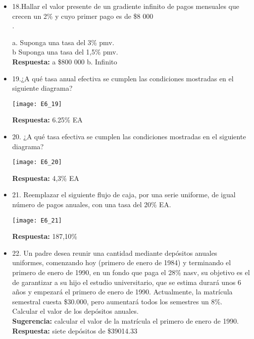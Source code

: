 \begin{itemize}
	\item 18.Hallar el valor presente de un gradiente infinito de pagos mensuales que crecen un 2\% y cuyo primer pago es de \$8 000\\.
	
	a. Suponga una tasa del 3\% pmv.\\
	b Suponga una tasa del 1,5\% pmv.\\
	\textbf{Respuesta:} a \$800 000 \hspace{0,5 cm}  b. Infinito\\
	
	\item 19.¿A qué tasa anual efectiva se cumplen las condiciones mostradas en el siguiente diagrama?\\
	\begin{center}
		\texttt{[image: E6\_19]}
	\end{center}
	\textbf{Respuesta:} 6.25\% EA\\
	\medskip
	
	\item 20. ¿A qué tasa efectiva se cumplen las condiciones mostradas en el siguiente diagrama?\\
	\begin{center}
		\texttt{[image: E6\_20]}
	\end{center}
	\textbf{Respuesta:} 4,3\% EA\\
	\medskip
	
	\item 21. Reemplazar el siguiente flujo de caja, por una serie uniforme, de igual número de pagos anuales, con una tasa del 20\% EA.\\
	\begin{center}
		\texttt{[image: E6\_21]}
	\end{center}
	\textbf{Respuesta:} 187,10\%\\
	\medskip
	
	\item 22. Un padre desea reunir una cantidad mediante depósitos anuales uniformes, comenzando hoy (primero de enero de 1984) y terminando el primero de enero de 1990, en un fondo que paga el 28\% nasv, su objetivo es el de garantizar a su hijo el estudio universitario, que se estima durará unos 6 años y empezará el primero de enero de 1990. Actualmente, la matrícula semestral cuesta \$30.000, pero aumentará todos los semestres un 8\%. Calcular el valor de los depósitos anuales.\\ 
	\textbf{Sugerencia:} calcular el valor de la matrícula el primero de enero de 1990.\\
	\textbf{Respuesta:} siete depósitos de \$39014.33\\
	\medskip
	

\end{itemize}
